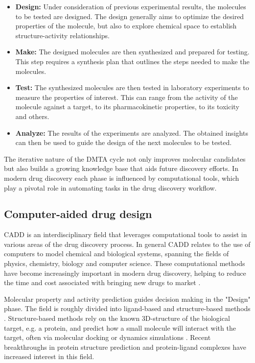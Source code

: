 \begin{itemize}
	\item \textbf{Design:} Under consideration of previous experimental results, the molecules to
	      be tested are designed. The design generally aims to optimize the desired properties of
	      the molecule, but also to explore chemical space to establish structure-activity relationships.
	\item \textbf{Make:} The designed molecules are then synthesized and prepared for testing. This
	      step requires a synthesis plan that outlines the steps needed to make the molecules.
	\item \textbf{Test:} The synthesized molecules are then tested in laboratory experiments to
	      measure the properties of interest. This can range from the activity of the molecule
	      against a target, to its pharmacokinetic properties, to its toxicity and others.
	\item \textbf{Analyze:} The results of the experiments are analyzed. The obtained insights
	      can then be used to guide the design of the next molecules to be tested.
\end{itemize}

The iterative nature of the \ac{DMTA} cycle not only improves molecular candidates but also builds a growing knowledge
base that aids future discovery efforts. In modern drug discovery each phase is influenced by computational tools, which
play a pivotal role in automating tasks in the drug discovery workflow. 

\subsection{Computer-aided drug design}
\Ac{CADD} is an interdisciplinary field that leverages computational tools to assist in various areas of the drug
discovery process. In general \ac{CADD} relates to the use of computers to model chemical and biological systems,
spanning the fields of physics, chemistry, biology and computer science. These computational methods have become
increasingly important in modern drug discovery, helping to reduce the time and cost associated with bringing new drugs
to market
\citep{brownArtificialIntelligenceChemistry2020,niaziComputerAidedDrugDesign2023,sliwoskiComputationalMethodsDrug2014}.

Molecular property and activity prediction guides decision making in the "Design" phase. The field is roughly divided
into ligand-based and structure-based methods \citep{yuComputerAidedDrugDesign2017}. Structure-based methods rely on the
known 3D-structure of the biological target, e.g. a protein, and predict how a small molecule will interact with the
target, often via molecular docking \citep{morrisMolecularDocking2008} or dynamics simulations
\citep{weiStructureDynamicsDrug2024,hospitalMolecularDynamicsSimulations2015}. Recent breakthroughs in protein structure prediction
\citep{jumperHighlyAccurateProtein2021,baekAccuratePredictionProtein2021} and protein-ligand complexes
\citep{abramsonAccurateStructurePrediction2024} have increased interest in this field. 

